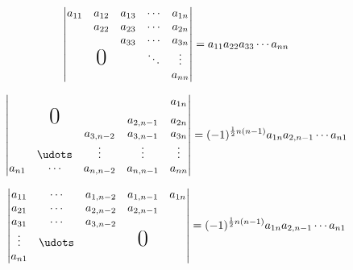 \begin{equation}
    \begin{vmatrix}
        a_{11} & a_{12}        & a_{13} & \cdots & a_{1n} \\
               & a_{22}        & a_{23} & \cdots & a_{2n} \\
               &               & a_{33} & \cdots & a_{3n} \\
               & \text{\huge0} &        & \ddots & \vdots \\
               &               &        &        & a_{nn}
    \end{vmatrix}
    = a_{11}a_{22}a_{33}\cdots a_{nn}
\end{equation}

\begin{equation}
    \begin{vmatrix}
               &               &           &           & a_{1n} \\
               & \text{\huge0} &           & a_{2,n-1} & a_{2n} \\
               &               & a_{3,n-2} & a_{3,n-1} & a_{3n} \\
               & \udots        & \vdots    & \vdots    & \vdots \\
        a_{n1} & \cdots        & a_{n,n-2} & a_{n,n-1} & a_{nn}
    \end{vmatrix}
    = (-1)^{\frac{1}{2}n(n-1)} a_{1n}a_{2,n-1}\cdots a_{n1}
\end{equation}

\begin{equation}
    \begin{vmatrix}
        a_{11} & \cdots & a_{1,n-2} & a_{1,n-1}     & a_{1n} \\
        a_{21} & \cdots & a_{2,n-2} & a_{2,n-1}     &        \\
        a_{31} & \cdots & a_{3,n-2} &               &        \\
        \vdots & \udots &           & \text{\huge0} &        \\
        a_{n1} &        &           &               &
    \end{vmatrix}
    = (-1)^{\frac{1}{2}n(n-1)} a_{1n}a_{2,n-1}\cdots a_{n1}
\end{equation}


